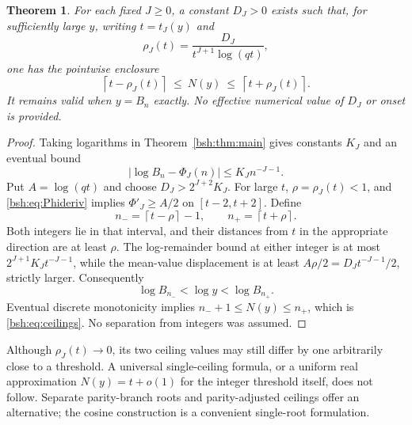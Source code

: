 \documentclass[11pt,letterpaper]{article}
\newtheorem{theorem}{Theorem}[section]
\theoremstyle{remark}\newtheorem{remark}[theorem]{Remark}
\newcommand{\ceil}[1]{\left\lceil #1\right\rceil}
\begin{document}
\begin{theorem}\label{bsh:thm:inverse}
For each fixed $J\geq0$, a constant $D_J>0$ exists such that, for sufficiently large $y$, writing $t=t_J(y)$ and
\[
 \rho_J(t)=\frac{D_J}{t^{J+1}\log(qt)},
\]
one has the pointwise enclosure
\begin{equation}\label{bsh:eq:ceilings}
 \ceil{t-\rho_J(t)}\ \leq\ N(y)\ \leq\ \ceil{t+\rho_J(t)}.
\end{equation}
It remains valid when $y=B_n$ exactly. No effective numerical value of $D_J$ or onset is provided.
\end{theorem}
\begin{proof}
Taking logarithms in Theorem~\ref{bsh:thm:main} gives constants $K_J$ and an eventual bound
\[
 |\log B_n-\Phi_J(n)|\leq K_J n^{-J-1}.
\]
Put $A=\log(qt)$ and choose $D_J>2^{J+2}K_J$. For large $t$, $\rho=\rho_J(t)<1$, and \eqref{bsh:eq:Phideriv} implies $\Phi'_J\geq A/2$ on $[t-2,t+2]$. Define
\[
 n_- = \ceil{t-\rho}-1,\qquad n_+=\ceil{t+\rho}.
\]
Both integers lie in that interval, and their distances from $t$ in the appropriate direction are at least $\rho$. The log-remainder bound at either integer is at most $2^{J+1}K_Jt^{-J-1}$, while the mean-value displacement is at least $A\rho/2=D_Jt^{-J-1}/2$, strictly larger. Consequently
\[
 \log B_{n_-}<\log y<\log B_{n_+}.
\]
Eventual discrete monotonicity implies $n_-+1\leq N(y)\leq n_+$, which is \eqref{bsh:eq:ceilings}. No separation from integers was assumed.
\end{proof}

Although $\rho_J(t)\to0$, its two ceiling values may still differ by one arbitrarily close to a threshold. A universal single-ceiling formula, or a uniform real approximation $N(y)=t+o(1)$ for the integer threshold itself, does not follow. Separate parity-branch roots and parity-adjusted ceilings offer an alternative; the cosine construction is a convenient single-root formulation.
\end{document}

